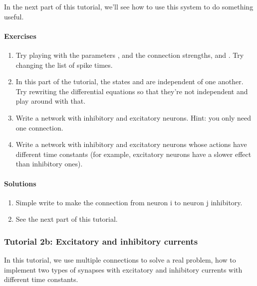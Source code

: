 \documentclass[letterpaper,10pt,english]{manual}
\begin{document}
In the next part of this tutorial, we'll see how to use this
system to do something useful.


\paragraph{Exercises}
\begin{enumerate}
\item {} 
Try playing with the parameters ,  and the connection
strengths,  and . Try changing the list of
spike times.

\item {} 
In this part of the tutorial, the states  and  are
independent of one another. Try rewriting the differential
equations so that they're not independent and play around
with that.

\item {} 
Write a network with inhibitory and excitatory neurons. Hint: you
only need one connection.

\item {} 
Write a network with inhibitory and excitatory neurons whose
actions have different time constants (for example, excitatory
neurons have a slower effect than inhibitory ones).

\end{enumerate}


\paragraph{Solutions}
\begin{enumerate}
\item {} 
Simple write  to make the connection from neuron
i to neuron j inhibitory.

\item {} 
See the next part of this tutorial.

\end{enumerate}

\resetcurrentobjects
\hypertarget{--doc-tutorial_2b_excitatory_and_inhibitory_currents}{}

\subsubsection{Tutorial 2b: Excitatory and inhibitory currents}

In this tutorial, we use multiple connections to solve a real problem, how
to implement two types of synapses with excitatory and inhibitory currents
with different time constants.
\end{document}
